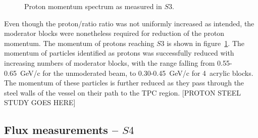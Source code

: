   \begin{figure}[ht]
    \centering
    \begin{adjustbox}{max totalsize={0.8\textwidth}, center}
      
    \end{adjustbox}
    \caption{Proton momentum spectrum as measured in $\mathit{S3}$.}
      \label{fig:s3promom}
  \end{figure}

  Even though the proton/ratio ratio was not uniformly increased as intended, the moderator blocks were nonetheless required for reduction of the proton momentum.
  The momentum of protons reaching $\mathit{S3}$ is shown in figure~\ref{fig:s3promom}. 
  The momentum of particles identified as protons was successfully reduced with increasing numbers of moderator blocks, with the range falling from 0.55-0.65~GeV/c for the unmoderated beam, to 0.30-0.45~GeV/c for 4~acrylic blocks.
  The momentum of these particles is further reduced as they pass through the steel walls of the vessel on their path to the TPC region.
  [PROTON STEEL STUDY GOES HERE]


  \subsection{Flux measurements -- $\mathit{S4}$}

    
